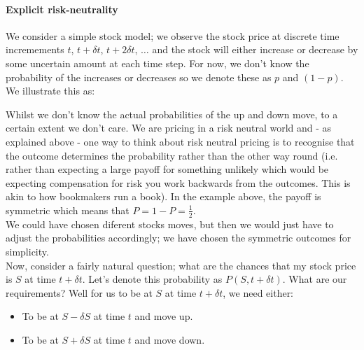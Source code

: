 \documentclass[../../Axiomathic.tex]{subfiles}
\begin{document}
\paragraph{Explicit risk-neutrality}
We consider a simple stock model; we observe the stock price at discrete time incremements $t$, $t+\delta t$, $t+2\delta t$, $\dots$ and the stock will either increase or decrease by some uncertain amount at each time step. For now, we don't know the probability of the increases or decreases so we denote these as $p$ and $(1-p)$. We illustrate this as:
\begin{center}

\end{center}
Whilst we don't know the actual probabilities of the up and down move, to a certain extent we don't care. We are pricing in a risk neutral world and - as explained above - one way to think about risk neutral pricing is to recognise that the outcome determines the probability rather than the other way round (i.e. rather than expecting a large payoff for something unlikely which would be expecting compensation for risk you work backwards from the outcomes. This is akin to how bookmakers run a book). In the example above, the payoff is symmetric which means that $P=1-P=\frac{1}{2}$. \\
We could have chosen diferent stocks moves, but then we would just have to adjust the probabilities accordingly; we have chosen the symmetric outcomes for simplicity. \\
Now, consider a fairly natural question; what are the chances that my stock price is $S$ at time $t + \delta t$. Let's denote this probability as $P(S,t + \delta t)$. What are our requirements? Well for us to be at $S$ at time $t + \delta t$, we need either:
\begin{itemize}
\item{To be at $S-\delta S$ at time $t$ and move up.}
\item{To be at $S+\delta S$ at time $t$ and move down.}
\end{itemize}
\end{document}
